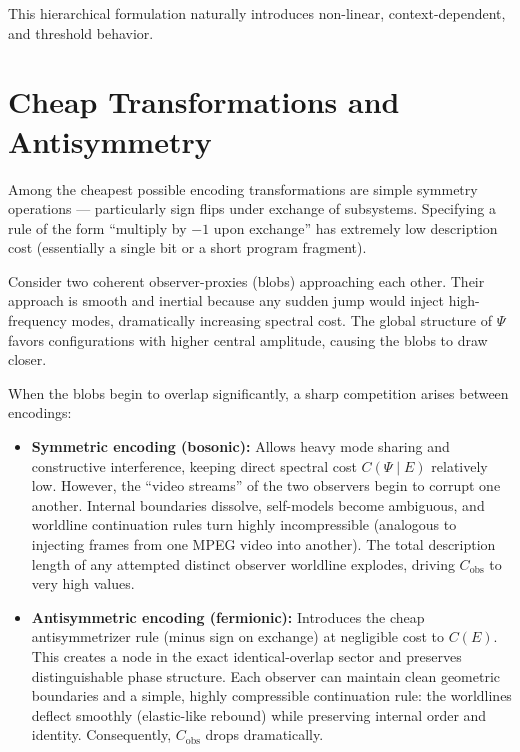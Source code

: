 This hierarchical formulation naturally introduces non-linear, context-dependent, and threshold behavior.

\section{Cheap Transformations and Antisymmetry}

Among the cheapest possible encoding transformations are simple symmetry operations — particularly sign flips under exchange of subsystems.
Specifying a rule of the form ``multiply by $-1$ upon exchange'' has extremely low description cost (essentially a single bit or a short program fragment).

Consider two coherent observer-proxies (blobs) approaching each other.
Their approach is smooth and inertial because any sudden jump would inject high-frequency modes, dramatically increasing spectral cost.
The global structure of \(\Psi\) favors configurations with higher central amplitude, causing the blobs to draw closer.

When the blobs begin to overlap significantly, a sharp competition arises between encodings:

\begin{itemize}
\item \textbf{Symmetric encoding (bosonic):} Allows heavy mode sharing and constructive interference, keeping direct spectral cost \(C(\Psi \mid E)\) relatively low.
  However, the ``video streams'' of the two observers begin to corrupt one another.
  Internal boundaries dissolve, self-models become ambiguous, and worldline continuation rules turn highly incompressible (analogous to injecting frames from one MPEG video into another).
  The total description length of any attempted distinct observer worldline explodes, driving \(C_{\text{obs}}\) to very high values.

\item \textbf{Antisymmetric encoding (fermionic):} Introduces the cheap antisymmetrizer rule (minus sign on exchange) at negligible cost to \(C(E)\). This creates a node in the exact identical-overlap sector and preserves distinguishable phase structure.
  Each observer can maintain clean geometric boundaries and a simple, highly compressible continuation rule: the worldlines deflect smoothly (elastic-like rebound) while preserving internal order and identity.
  Consequently, \(C_{\text{obs}}\) drops dramatically.
\end{itemize}

